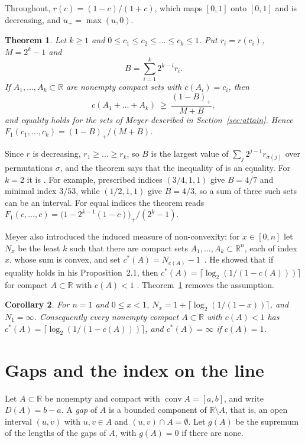 \documentclass[11pt]{amsart}
\newtheorem{theorem}{Theorem}[section]
\newtheorem{corollary}[theorem]{Corollary}
\theoremstyle{remark}
\DeclareMathOperator{\conv}{conv}
\begin{document}
Throughout, $r(c)=(1-c)/(1+c)$, which maps $[0,1]$ onto $[0,1]$ and is decreasing, and $u_+=\max(u,0)$.

\begin{theorem}\label{thm:main}
Let $k\ge1$ and $0\le c_1\le c_2\le\dots\le c_k\le1$. Put $r_i=r(c_i)$, $M=2^k-1$ and
\[
  B=\sum_{i=1}^k 2^{k-i}r_i .
\]
If $A_1,\dots,A_k\subset\mathbb{R}$ are nonempty compact sets with $c(A_i)=c_i$, then
\[
  c(A_1+\dots+A_k)\ \ge\ \frac{(1-B)_+}{M+B},
\]
and equality holds for the sets of Meyer described in Section~\ref{sec:attain}. Hence
$F_1(c_1,\dots,c_k)=(1-B)_+/(M+B)$.
\end{theorem}

Since $r$ is decreasing, $r_1\ge\dots\ge r_k$, so $B$ is the largest value of $\sum_j2^{j-1}r_{\sigma(j)}$ over
permutations $\sigma$, and the theorem says that the inequality of \cite[Proposition~2.1]{MeyerArx} is an equality.
For $k=2$ it is \cite[Theorem~1.2 and Corollary~1.2]{MeyerJIA}. For example, prescribed indices $(3/4,1,1)$ give $B=4/7$ and minimal
index $3/53$, while $(1/2,1,1)$ give $B=4/3$, so a sum of three such sets can be an interval. For equal indices the theorem reads
$F_1(c,\dots,c)=\bigl(1-2^{k-1}(1-c)\bigr)_+/(2^k-1)$.

Meyer also introduced the induced measure of non-convexity: for $x\in[0,n]$ let $N_x$ be the least $k$ such that there
are compact sets $A_1,\dots,A_k\subset\mathbb{R}^n$, each of index $x$, whose sum is convex, and set
$c^\ast(A)=N_{c(A)}-1$~\cite[Definition~2.1]{MeyerArx}. He showed that if equality holds in his Proposition~2.1, then
$c^\ast(A)=\lceil\log_2(1/(1-c(A)))\rceil$ for compact $A\subset\mathbb{R}$ with $c(A)<1$
\cite[Proposition~2.2]{MeyerArx}. Theorem~\ref{thm:main} removes the assumption.

\begin{corollary}\label{cor:induced}
For $n=1$ and $0\le x<1$, $N_x=1+\lceil\log_2(1/(1-x))\rceil$, and $N_1=\infty$. Consequently every nonempty compact
$A\subset\mathbb{R}$ with $c(A)<1$ has $c^\ast(A)=\lceil\log_2(1/(1-c(A)))\rceil$, and $c^\ast(A)=\infty$ if $c(A)=1$.
\end{corollary}

\section{Gaps and the index on the line}

Let $A\subset\mathbb{R}$ be nonempty and compact with $\conv A=[a,b]$, and write $D(A)=b-a$. A \emph{gap} of $A$ is a
bounded component of $\mathbb{R}\setminus A$, that is, an open interval $(u,v)$ with $u,v\in A$ and $(u,v)\cap A=\emptyset$.
Let $g(A)$ be the supremum of the lengths of the gaps of $A$, with $g(A)=0$ if there are none.
\end{document}
